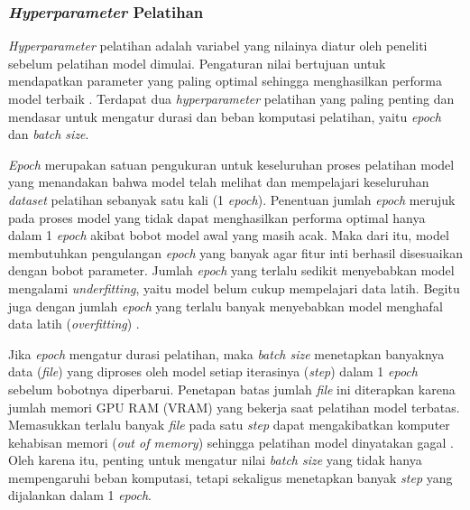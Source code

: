 \subsubsection{\textit{Hyperparameter} Pelatihan} \label{II.Teori10.1}
\textit{Hyperparameter} pelatihan adalah variabel yang nilainya diatur oleh peneliti sebelum pelatihan model dimulai.
Pengaturan nilai bertujuan untuk mendapatkan parameter yang paling optimal sehingga menghasilkan performa model terbaik \cite{goodfellow2016deep}. 
Terdapat dua \textit{hyperparameter} pelatihan yang paling penting dan mendasar untuk mengatur durasi dan beban komputasi pelatihan, yaitu \textit{epoch} dan \textit{batch size}. \par

\textit{Epoch} merupakan satuan pengukuran untuk keseluruhan proses pelatihan model yang menandakan bahwa model telah melihat dan mempelajari keseluruhan \textit{dataset} pelatihan sebanyak satu kali (1 \textit{epoch}). 
Penentuan jumlah \textit{epoch} merujuk pada proses model yang tidak dapat menghasilkan performa optimal hanya dalam 1 \textit{epoch} akibat bobot model awal yang masih acak.
Maka dari itu, model membutuhkan pengulangan \textit{epoch} yang banyak agar fitur inti berhasil disesuaikan dengan bobot parameter. 
Jumlah \textit{epoch} yang terlalu sedikit menyebabkan model mengalami \textit{underfitting}, yaitu model belum cukup mempelajari data latih. 
Begitu juga dengan jumlah \textit{epoch} yang terlalu banyak menyebabkan model menghafal data latih (\textit{overfitting}) \cite{goodfellow2016deep,bengio2012practical}. \par

Jika \textit{epoch} mengatur durasi pelatihan, maka \textit{batch size} menetapkan banyaknya data (\textit{file}) yang diproses oleh model setiap iterasinya (\textit{step}) dalam 1 \textit{epoch} sebelum bobotnya diperbarui.
Penetapan batas jumlah \textit{file} ini diterapkan karena jumlah memori GPU RAM (VRAM) yang bekerja saat pelatihan model terbatas.
Memasukkan terlalu banyak \textit{file} pada satu \textit{step} dapat mengakibatkan komputer kehabisan memori (\textit{out of memory}) sehingga pelatihan model dinyatakan gagal \cite{bengio2012practical}.
Oleh karena itu, penting untuk mengatur nilai \textit{batch size} yang tidak hanya mempengaruhi beban komputasi, tetapi sekaligus menetapkan banyak \textit{step} yang dijalankan dalam 1 \textit{epoch}. \par

